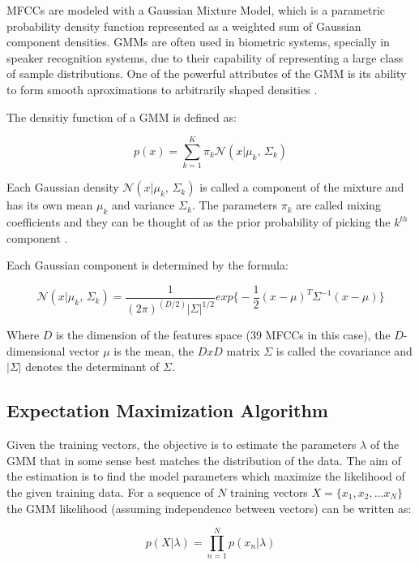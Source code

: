 MFCCs are modeled with a Gaussian Mixture Model, which is a parametric probability density
function represented as a weighted sum of Gaussian component densities. GMMs are often
used in biometric systems, specially in speaker recognition systems, due to their
capability of representing a large class of sample distributions. One of the powerful
attributes of the GMM is its ability to form smooth aproximations to arbitrarily shaped
densities \cite{gmm_reynolds}.

The densitiy function of a GMM is defined as:

\begin{equation}
	p(x) = \sum_{k=1}^{K}\pi_{k} \mathcal{N}(x|\mu_{k},\,\Sigma_{k})
\end{equation}

Each Gaussian density $\mathcal{N}(x|\mu_{k},\,\Sigma_{k})$ is called a component of the mixture
and has its own mean $\mu_{k}$ and variance $\Sigma_{k}$. The parameters $\pi_{k}$ are called
mixing coefficients and they can be thought of as the prior probability of picking the $k^{th}$
component \cite{gmm_bishop}.

Each Gaussian component is determined by the formula:

\begin{equation}
	\mathcal{N}(x|\mu_{k},\,\Sigma_{k}) = \frac{1}{(2\pi)^{(D/2)}|\Sigma|^{1/2}} exp \big\{ -\frac{1}{2}(x-\mu)^{T}\Sigma^{-1}(x-\mu)\}
\end{equation}

Where $D$ is the dimension of the features space (39 MFCCs in this case), the $D$-dimensional
vector $\mu$ is the mean, the $DxD$ matrix $\Sigma$ is called the covariance and $|\Sigma|$
denotes the determinant of $\Sigma$.

\subsection{Expectation Maximization Algorithm}

Given the training vectors, the objective is to estimate the parameters $\lambda$ of the GMM
that in some sense best matches the distribution of the data. The aim of the estimation is
to find the model parameters which maximize the likelihood of the given training data. For a
sequence of $N$ training vectors $X=\{x_{1}, x_{2}, \dotsc x_{N}\}$ the GMM likelihood
(assuming independence between vectors) can be written as:

\begin{equation}
	\label{eq:likelihoodGMM}
	p(X|\lambda) = \prod_{n=1}^{N}p(x_{n}|\lambda)
\end{equation}

